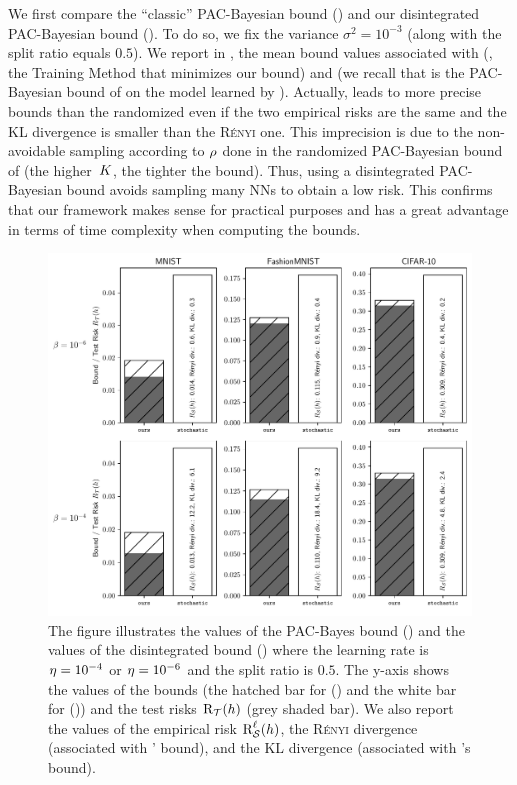 We first compare the ``classic'' PAC-Bayesian bound () and our disintegrated PAC-Bayesian bound ().
To do so, we fix the variance $\sigma^2{=}10^{-3}$ (along with the split ratio equals $0.5$).
We report in , the mean bound values associated with \algoours (\ie, the Training Method that minimizes our bound) and \algostoNN 
(we recall that \algostoNN is the PAC-Bayesian bound of  on the model learned by \algoours).
Actually, \algoours leads to more precise bounds than the randomized \algostoNN even if the two empirical risks are the same and the KL divergence is smaller than the \textsc{Rényi} one.
This imprecision is due to the non-avoidable sampling according to $\rho$ done in the randomized PAC-Bayesian bound of  (the \mbox{higher $K$}, the tighter the bound).
Thus, using a disintegrated PAC-Bayesian bound avoids sampling many NNs to obtain a low risk.
This confirms that our framework makes sense for practical purposes and has a great advantage in terms of time complexity when computing the bounds.

\begin{figure}[!t]
    \centering
    \includegraphics[width=1.0\linewidth]{chapter_6/figures/plot_2_prior_0.5_var_0.001.pdf}
    \caption[Comparisons of the PAC-Bayesian Bounds and the Disintegrated Bounds]{%
    The figure illustrates the values of the PAC-Bayes bound () and the values of the disintegrated bound () where the learning rate is $\eta=10^{-4}$ or $\eta=10^{-6}$ and the split ratio is $0.5$.
    The y-axis shows the values of the bounds (the hatched bar for \algoours () and the white bar for \algostoNN ()) and the test risks $\text{R}_{\mathcal{T}}(h)$ (grey shaded bar).
  We also report the values of the empirical risk $\text{R}^{\ell}_{\mathcal{S}}(h)$, the \textsc{Rényi} divergence (associated with \algoours' bound), and the KL divergence (associated with \algostoNN's bound). 
}
    \label{chap:dis-pra:figure:exp-2}
\end{figure}

